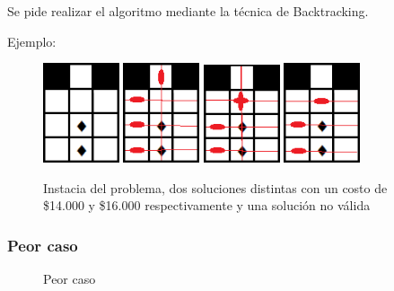\documentclass[a4paper, 10pt, twoside]{article}
\begin{document}
Se pide realizar el algoritmo mediante la técnica de Backtracking.

Ejemplo:
\begin{figure}[H]
  \centering
\includegraphics[width=0.20\textwidth]{ejemplo_problema3/grilla.png}
\includegraphics[width=0.20\textwidth]{ejemplo_problema3/grilla-sol16000.png}
\includegraphics[width=0.20\textwidth]{ejemplo_problema3/grilla-sol14000.png}
\includegraphics[width=0.20\textwidth]{ejemplo_problema3/grillaSinSol.png}
  \caption{Instacia del problema, dos soluciones distintas con un costo de \$14.000 y \$16.000 respectivamente y una solución no válida} 
  \label{fig:1}
\end{figure}


\subsubsection{Peor caso}

\begin{figure}[H]
  \centering
  
  \caption{Peor caso}
\end{figure}
\end{document}
